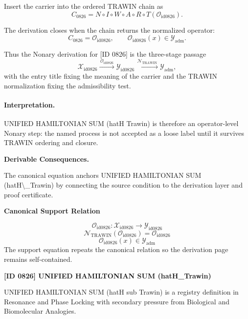 Insert the carrier into the ordered TRAWIN chain as\[
C_{0826}=N\circ I\circ W\circ A\circ R\circ T(\mathcal{O}_{\mathrm{id0826}}).
\]

The derivation closes when the chain returns the normalized operator:\[
C_{0826}=\mathcal{O}_{\mathrm{id0826}},\qquad \mathcal{O}_{\mathrm{id0826}}(x)\in\mathcal{Y}_{\mathrm{adm}}.
\]

Thus the Nonary derivation for [ID 0826] is the three-stage passage
\[
\mathcal{X}_{\mathrm{id0826}}\xrightarrow{\,\mathcal{O}_{\mathrm{id0826}}\,} \mathcal{Y}_{\mathrm{id0826}}\xrightarrow{\,\mathcal{N}_{\mathrm{TRAWIN}}\,} \mathcal{Y}_{\mathrm{adm}},
\]
with the entry title fixing the meaning of the carrier and the TRAWIN normalization fixing the admissibility test.

\paragraph{Interpretation.} UNIFIED HAMILTONIAN SUM (hatH Trawin) is therefore an operator-level Nonary step: the named process is not accepted as a loose label until it survives TRAWIN ordering and closure.

\par\vspace{0.35em}
\noindent\textbf{Derivable Consequences.}\quad
\begingroup
\footnotesize
\raggedright
The canonical equation anchors UNIFIED HAMILTONIAN SUM (hatH\textbackslash{}\_Trawin) by connecting the source condition to the derivation layer and proof certificate.
\par\endgroup

\noindent\textbf{Canonical Support Relation}\par
\[
\mathcal{O}_{\mathrm{id0826}}:\mathcal{X}_{\mathrm{id0826}}\longrightarrow\mathcal{Y}_{\mathrm{id0826}}
\]
\[
\mathcal{N}_{\mathrm{TRAWIN}}(\mathcal{O}_{\mathrm{id0826}})=\mathcal{O}_{\mathrm{id0826}}
\]
\[
\mathcal{O}_{\mathrm{id0826}}(x)\in\mathcal{Y}_{\mathrm{adm}}
\]
\noindent The support equation repeats the canonical relation so the derivation page remains self-contained.\par

\clearpage
\noindent\textbf{[ID 0826] UNIFIED HAMILTONIAN SUM (hatH\_Trawin)}\par
\vspace{0.35em}
\begingroup\small
{}
UNIFIED HAMILTONIAN SUM (hatH sub Trawin) is a registry definition in Resonance and Phase Locking with secondary pressure from Biological and Biomolecular Analogies.


